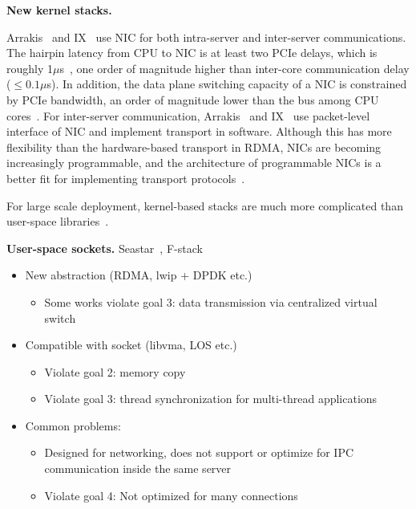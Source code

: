 \textbf{New kernel stacks.}

Arrakis~\cite{peter2016arrakis} and IX~\cite{belay2017ix} use NIC for both intra-server and inter-server communications. The hairpin latency from CPU to NIC is at least two PCIe delays, which is roughly 1$\mu$s~\cite{kaminsky2016design}, one order of magnitude higher than inter-core communication delay ($\leq0.1\mu$s). In addition, the data plane switching capacity of a NIC is constrained by PCIe bandwidth, an order of magnitude lower than the bus among CPU cores~\cite{li2017kv}. For inter-server communication, Arrakis~\cite{peter2016arrakis} and IX~\cite{belay2017ix} use packet-level interface of NIC and implement transport in software. Although this has more flexibility than the hardware-based transport in RDMA, NICs are becoming increasingly programmable, and the architecture of programmable NICs is a better fit for implementing transport protocols~\cite{kaufmann2015flexnic,smartnic,mellanox,cavium}. 

For large scale deployment, kernel-based stacks are much more complicated than user-space libraries~\cite{andromeda}.

\textbf{User-space sockets.}
Seastar~\cite{seastar}, F-stack~\cite{fstack}


\begin{itemize}
\item New abstraction (RDMA, lwip + DPDK etc.) 
\begin{itemize}
	\item Some works violate goal 3: data transmission via centralized virtual switch 
\end{itemize}
\item Compatible with socket (libvma, LOS etc.) 
\begin{itemize}
	\item Violate goal 2: memory copy 
	\item Violate goal 3: thread synchronization for multi-thread applications 
\end{itemize}
\item Common problems: 
\begin{itemize}
	\item Designed for networking, does not support or optimize for IPC communication inside the same server 
	\item Violate goal 4: Not optimized for many connections 
\end{itemize}
\end{itemize}



